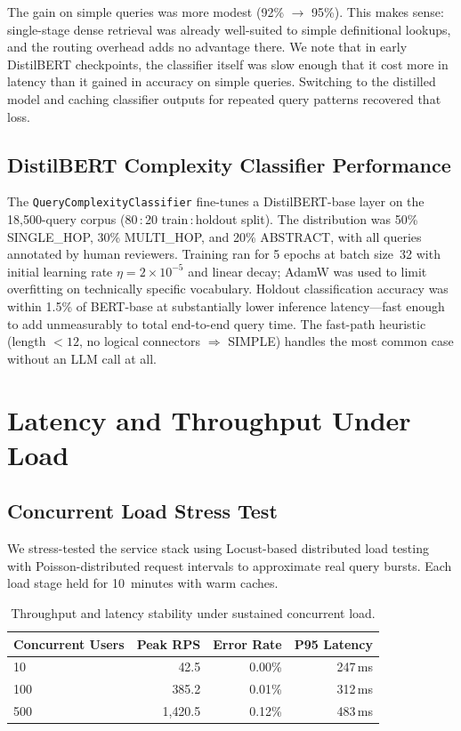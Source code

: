 The gain on simple queries was more modest (92\% $\rightarrow$ 95\%).
This makes sense: single-stage dense retrieval was already well-suited to
simple definitional lookups, and the routing overhead adds no advantage
there. We note that in early DistilBERT checkpoints, the classifier itself
was slow enough that it cost more in latency than it gained in accuracy on
simple queries. Switching to the distilled model and caching classifier
outputs for repeated query patterns recovered that loss.

\subsection{DistilBERT Complexity Classifier Performance}

The \texttt{QueryComplexityClassifier} fine-tunes a DistilBERT-base layer
on the 18,500-query corpus (80\,:\,20 train\,:\,holdout split). The
distribution was 50\% SINGLE\_HOP, 30\% MULTI\_HOP, and 20\% ABSTRACT,
with all queries annotated by human reviewers. Training ran for 5 epochs
at batch size~32 with initial learning rate $\eta = 2 \times 10^{-5}$ and
linear decay; AdamW was used to limit overfitting on technically specific
vocabulary. Holdout classification accuracy was within 1.5\% of BERT-base
at substantially lower inference latency---fast enough to add unmeasurably
to total end-to-end query time. The fast-path heuristic (length $< 12$,
no logical connectors $\Rightarrow$ SIMPLE) handles the most common case
without an LLM call at all.

\section{Latency and Throughput Under Load}
\label{sec:perf-results}

\subsection{Concurrent Load Stress Test}

We stress-tested the service stack using Locust-based distributed load
testing with Poisson-distributed request intervals to approximate real
query bursts. Each load stage held for 10~minutes with warm caches.

\begin{table}[ht]
    \centering
    \caption{Throughput and latency stability under sustained concurrent load.}
    \label{tab:scaling}
    \begin{tabular}{lrrr}
        \toprule
        \textbf{Concurrent Users} & \textbf{Peak RPS} &
        \textbf{Error Rate} & \textbf{P95 Latency} \\
        \midrule
        10    &   42.5  & 0.00\% & 247\,ms \\
        100   &  385.2  & 0.01\% & 312\,ms \\
        500   & 1{,}420.5 & 0.12\% & 483\,ms \\
        \bottomrule
    \end{tabular}
\end{table}

